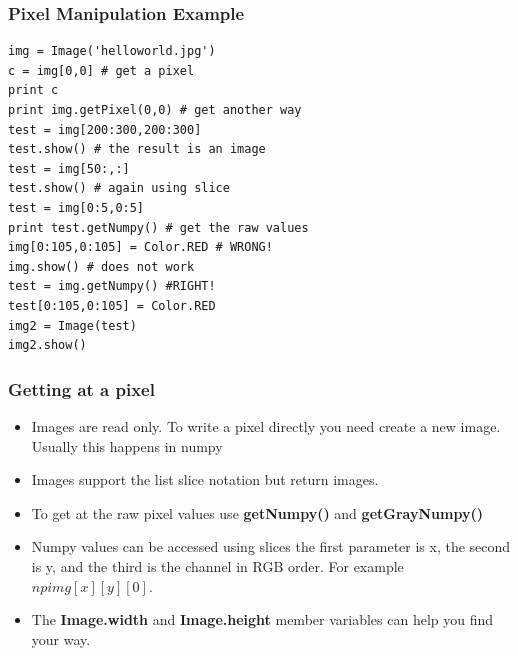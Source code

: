 \documentclass{beamer}
\begin{document}
\begin{frame}[fragile] 
\frametitle{Pixel Manipulation Example}
\begin{example}
\begin{verbatim}
img = Image('helloworld.jpg')
c = img[0,0] # get a pixel
print c
print img.getPixel(0,0) # get another way
test = img[200:300,200:300]
test.show() # the result is an image
test = img[50:,:]
test.show() # again using slice
test = img[0:5,0:5]
print test.getNumpy() # get the raw values
img[0:105,0:105] = Color.RED # WRONG!
img.show() # does not work 
test = img.getNumpy() #RIGHT!
test[0:105,0:105] = Color.RED
img2 = Image(test)
img2.show()
\end{verbatim}
\end{example}
\end{frame}
\begin{frame}
\frametitle{Getting at a pixel}
\begin{itemize}
\item Images are read only. To write a pixel directly you need create a new
  image. Usually this happens in numpy
\item Images support the list slice notation but return images.
\item To get at the raw pixel values use \textbf{getNumpy()} and \textbf{getGrayNumpy()} 
\item Numpy values can be accessed using slices the first parameter is
  x, the second is y,  and the third is the channel in RGB order. For
  example $npimg[x][y][0]$. 
\item The \textbf{Image.width} and \textbf{Image.height} member
  variables can help you find your way. 
\end{itemize}
\end{frame}
\end{document}
